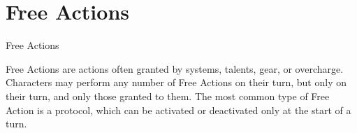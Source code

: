 \section{Free Actions}
   Free Actions  

Free Actions are actions often granted by systems, talents, gear, or overcharge. Characters may  
perform any number of Free Actions on their turn, but only on their turn, and only those granted  
to them. The most common type of Free Action is a protocol, which can be activated or  
deactivated only at the start of a turn.